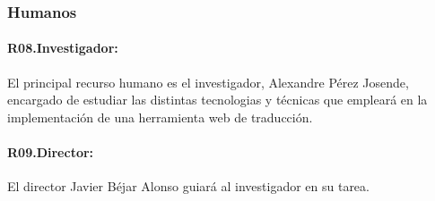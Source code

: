 \subsubsection{Humanos}
\paragraph{R08.\quad Investigador:}\label{R08}
El principal recurso humano es el investigador, Alexandre Pérez Josende,
encargado de estudiar las distintas tecnologias y técnicas que empleará en la
implementación de una herramienta web de traducción.

\paragraph{R09.\quad Director:}\label{R09}
El director Javier Béjar Alonso guiará al investigador en su tarea.


